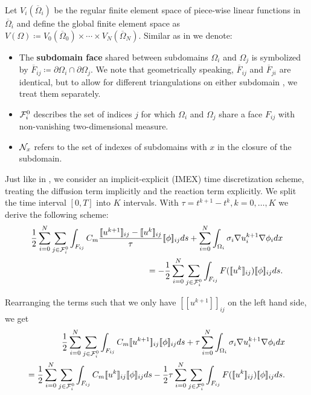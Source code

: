 Let $V_i(\overline{\Omega}_i)$ be the regular finite element space of piece-wise linear functions in $\overline{\Omega}_i$ and define the global finite element space as $V(\Omega) \coloneqq V_0(\overline{\Omega}_0)\times\cdots\times V_N(\overline{\Omega}_N)$. Similar as in \cite{sarkis-3D} we denote:
\begin{itemize}
    \item The \textbf{subdomain face} shared between subdomains $\Omega_i$ and $\Omega_j$ is symbolized by $\overline{F}_{ij} \coloneqq \partial \Omega_i \cap \partial \Omega_j$. We note that geometrically speaking, $\overline{F}_{ij}$ and $\overline{F}_{ji}$ are identical, but to allow for different triangulations on either subdomain \cite{sarkis-3D}, we treat them separately.
    \item $\mathcal{F}_i^0$ describes the set of indices $j$ for which $\Omega_i$ and $\Omega_j$ share a face $F_{ij}$ with non-vanishing two-dimensional measure.
    \item $\mathcal{N}_x$ refers to the set of indexes of subdomains with $x$ in the closure of the subdomain.
\end{itemize}
Just like in \cite{2D-proof}, we consider an implicit-explicit (IMEX) time discretization scheme, treating the diffusion term implicitly and the reaction term explicitly. We split the time interval $[0,T]$ into $K$ intervals. With $\tau = t^{k + 1} - t^k, k = 0,\dots,K$ we derive the following scheme:
\begin{equation*}
    \begin{split}
        \frac{1}{2}\sum_{i = 0}^N\sum_{j \in \F_i^0}\int_{F_{ij}}C_m\frac{[\![u^{k + 1}]\!]_{ij} - [\![u^k]\!]_{ij}}{\tau}[\![\phi]\!]_{ij}ds + \sum_{i = 0}^N\int_{\Omega_i}\sigma_i\nabla u_i^{k+1}\nabla\phi_idx \\
        =-\frac{1}{2}\sum_{i=0}^N\sum_{j \in \F_i^0}\int_{F_{ij}}F([\![u^k]\!]_{ij})[\![\phi]\!]_{ij}ds.
    \end{split}
\end{equation*}

Rearranging the terms such that we only have $[\![u^{k+1}]\!]_{ij}$ on the left hand side, we get
\begin{equation}
\begin{split}
\frac{1}{2}\sum_{i=0}^N\sum_{j\in \F_i^0}\int_{F_{ij}}C_m[\![u^{k+1}]\!]_{ij}[\![\phi]\!]_{ij}ds + \tau \sum_{i=0}^N\int_{\Omega_i}\sigma_i\nabla u_i^{k+1}\nabla\phi_idx \\
=\frac{1}{2}\sum_{i=0}^N\sum_{j\in \F_i^0}\int_{F_{ij}}C_m[\![u^k]\!]_{ij}[\![\phi]\!]_{ij}ds - \frac{1}{2}\tau\sum_{i=0}^N\sum_{j \in \F_i^0}\int_{F_{ij}}F([\![u^k]\!]_{ij})[\![\phi]\!]_{ij}ds.
\end{split}
\end{equation}

